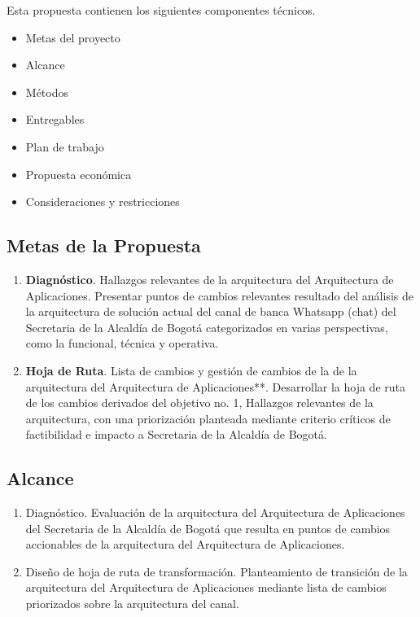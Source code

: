 \documentclass[
	a4paper, %
	12pt, %
]{include/CSSullivanBusinessReport}
\def\tightlist{}
\begin{document}
Esta propuesta contienen los siguientes componentes técnicos.

\begin{itemize}
\tightlist
\item
  Metas del proyecto
\item
  Alcance
\item
  Métodos
\item
  Entregables
\item
  Plan de trabajo
\item
  Propuesta económica
\item
  Consideraciones y restricciones
\end{itemize}

\subsection{Metas de la Propuesta}\label{sec:metas-de-la-propuesta}

\begin{quote}
\end{quote}

\begin{enumerate}
\def\labelenumi{\arabic{enumi}.}
\tightlist
\item
  \textbf{Diagnóstico}. Hallazgos relevantes de la arquitectura del
  Arquitectura de Aplicaciones. Presentar puntos de cambios relevantes
  resultado del análisis de la arquitectura de solución actual del canal
  de banca Whatsapp (chat) del Secretaria de la Alcaldía de Bogotá
  categorizados en varias perspectivas, como la funcional, técnica y
  operativa.
\item
  \textbf{Hoja de Ruta}. Lista de cambios y gestión de cambios de la de
  la arquitectura del Arquitectura de Aplicaciones**. Desarrollar la
  hoja de ruta de los cambios derivados del objetivo no. 1, Hallazgos
  relevantes de la arquitectura, con una priorización planteada mediante
  criterio críticos de factibilidad e impacto a Secretaria de la
  Alcaldía de Bogotá.
\end{enumerate}

\subsection{Alcance}\label{sec:alcance}

\begin{quote}
\end{quote}

\begin{enumerate}
\def\labelenumi{\arabic{enumi}.}
\tightlist
\item
  Diagnóstico. Evaluación de la arquitectura del Arquitectura de
  Aplicaciones del Secretaria de la Alcaldía de Bogotá que resulta en
  puntos de cambios accionables de la arquitectura del Arquitectura de
  Aplicaciones.
\item
  Diseño de hoja de ruta de transformación. Planteamiento de transición
  de la arquitectura del Arquitectura de Aplicaciones mediante lista de
  cambios priorizados sobre la arquitectura del canal.
\end{enumerate}
\end{document}
